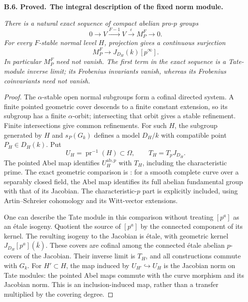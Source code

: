 \documentclass[11pt,a4paper]{article}
\newenvironment{claim}[3]{\par\medskip\noindent\hypertarget{#1}{\textbf{#1. #2.}}\ \textbf{#3.}\par\nopagebreak\smallskip\begingroup\itshape}{\endgroup\par\smallskip}
\begin{document}
\begin{claim}{B.6}{Proved}{The integral description of the fixed norm module}
There is a natural exact sequence of compact abelian pro-$p$ groups
\[
 0\longrightarrow V\xrightarrow{F-1}V
   \xrightarrow{\varepsilon}M_P^F\longrightarrow0.
\]
For every $F$-stable normal level $H$, projection gives a continuous
surjection
\[
 M_P^F\longrightarrow J_{D_H}(k)[p^\infty].
\]
In particular $M_P^F$ need not vanish. The first term in the exact
sequence is a Tate-module inverse limit; its Frobenius invariants
vanish, whereas its Frobenius coinvariants need not vanish.
\end{claim}
\begin{proof}
The $\alpha$-stable open normal subgroups form a cofinal directed
system. A finite pointed geometric cover descends to a finite
constant extension, so its subgroup has a finite $\alpha$-orbit;
intersecting that orbit gives a stable refinement. Finite
intersections give common refinements. For such $H$, the subgroup
generated by $H$ and $s_P(G_k)$ defines a model $D_H/k$ with
compatible point $P_H\in D_H(k)$. Put
\[
 U_H=\operatorname{pr}^{-1}(H)\subset\Omega,
 \qquad T_H=T_pJ_{D_H}.
\]
The pointed Abel map identifies $U_H^{\mathrm{ab},p}$ with $T_H$,
including the characteristic prime. The exact geometric comparison
is \cite[Proposition 9.1, Lemmas 9.4--9.5, and Corollary 9.6]{MilneJac}:
for a smooth complete curve over a separably closed field, the Abel
map identifies its full abelian fundamental group with that of its
Jacobian. The characteristic-$p$ part is explicitly included, using
Artin--Schreier cohomology and its Witt-vector extensions.

One can describe the Tate module in this comparison without treating
$[p^a]$ as an étale isogeny. Quotient the source of $[p^a]$ by
the connected component of its kernel. The resulting isogeny to the
Jacobian is étale, with geometric kernel
$J_{D_H}[p^a](\bar k)$. These covers are cofinal among the
connected étale abelian $p$-covers of the Jacobian. Their inverse
limit is $T_H$, and all constructions commute with $G_k$.
For $H'\subset H$, the map induced by
$U_{H'}\hookrightarrow U_H$ is the Jacobian norm on Tate modules:
the pointed Abel maps commute with the curve morphism and its
Jacobian norm. This is an inclusion-induced map, rather than a
transfer multiplied by the covering degree.


\end{proof}
\end{document}
